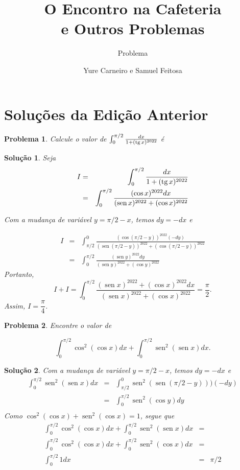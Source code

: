 \documentclass{hipatia}
\title{O Encontro na Cafeteria\\ e Outros Problemas}
\author{Yure Carneiro e Samuel Feitosa}
\subtitle{Problema}
\DeclareMathOperator{\sen}{sen}
\newtheorem{problem*}{Problema}
\newtheorem*{solution*}{Solução}
\newcommand{\tg}{\mathop{\rm tg}}
\begin{document}
\setcounter{page}{\problemapage}
\maketitle


\section{Soluções da Edição Anterior}

\begin{problem*}
Calcule o valor de $\int_0^{\pi/2} \frac{dx}{1 + (\tg x)^{2022}}$ é
\end{problem*}

\begin{solution*}
Seja 
\begin{eqnarray*}
I & = & \int_0^{\pi/2} \frac{dx}{1 + (\tg x)^{2022}} \\
  & = & \int_0^{\pi/2} \frac{(\cos x)^{2022} dx}{(\sen x)^{2022} + (\cos x)^{2022}}
\end{eqnarray*}

Com a mudança de variável $y=\pi/2-x$, temos $dy = -dx$ e

\begin{eqnarray*}
I & = &  \int_{\pi/2}^0 \frac{(\cos (\pi/2-y))^{2022} (-dy)}{(\sen (\pi/2-y))^{2022} + (\cos (\pi/2-y))^{2022}} \\
& = & \int_0^{\pi/2} \frac{(\sen y)^{2022} dy}{(\sen y)^{2022} + (\cos y)^{2022}}
\end{eqnarray*}
Portanto, 
$$I + I = \int_0^{\pi/2} \frac{(\sen x)^{2022}+(\cos x)^{2022} dx}{(\sen x)^{2022}+(\cos x)^{2022}} = \dfrac{\pi}{2}.$$
Assim, $I=\dfrac{\pi}{4}$.

\end{solution*}

\begin{problem*}
Encontre o valor de 

$$\displaystyle \int_0^{\pi/2} \cos^2 (\cos x)dx + \int_0^{\pi/2} \sen^2 (\sen x)dx .$$

\end{problem*}

\begin{solution*}
Com a mudança de variável $y=\pi/2-x$, temos $dy = -dx$ e 
\begin{eqnarray*}
\int_0^{\pi/2} \sen^2 (\sen x)dx & = & \int_{\pi/2}^{0} \sen^2 (\sen (\pi/2-y)))(-dy) \\
                                & = & \int_{0}^{\pi/2} \sen^2 (\cos y)dy \\
\end{eqnarray*}
\noindent Como $\cos^2 (\cos x)+\sen^2(\cos x)=1$, segue que 
\begin{eqnarray*}
\int_0^{\pi/2} \cos^2 (\cos x)dx + \int_0^{\pi/2} \sen^2 (\sen x)dx & = & \\ 
\int_0^{\pi/2} \cos^2 (\cos x)dx + \int_0^{\pi/2} \sen^2 (\cos x)dx & = & \\
\int_0^{\pi/2} 1 dx & = & \pi/2
\end{eqnarray*}
\end{solution*}
\end{document}
